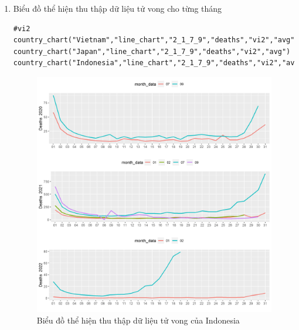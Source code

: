 \documentclass[a4paper]{article}
\theoremstyle{definition}
\begin{document}
\begin{enumerate}[i)]
\begin{enumerate}[1)]
    \item Biểu đồ thể hiện thu thập dữ liệu tử vong cho từng tháng
    \begin{lstlisting}[frame=single]  
#vi2
country_chart("Vietnam","line_chart","2_1_7_9","deaths","vi2","avg")
country_chart("Japan","line_chart","2_1_7_9","deaths","vi2","avg")
country_chart("Indonesia","line_chart","2_1_7_9","deaths","vi2","avg")
		\end{lstlisting}
		\begin{figure}[htp]
		    \centering
		    \includegraphics[scale = 0.7]{Images/VI/vi2 Indonesia .jpeg}
		    \caption{Biểu đồ thể hiện thu thập dữ liệu tử vong của Indonesia}
		    \label{fig:my_label}
		\end{figure}
		\begin{figure}[htp]
		    \centering

\end{figure}
\end{enumerate}
\end{enumerate}
\end{document}
